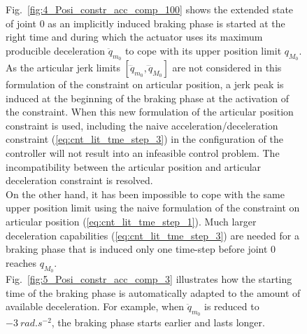 \begin{figure}[!htbp]
Fig.~\ref{fig:4_Posi_constr_acc_comp_100} shows the extended state of joint $0$ as an implicitly induced braking phase is started at the right time and during which the actuator uses its maximum producible deceleration $\ddot{q}_{m_{0}}$ to cope with its upper position limit $q_{M_{0}}$. As the articular jerk limits $[\dddot{q}_{m_{0}}, \dddot{q}_{M_{0}}]$ are not considered in this formulation of the constraint on articular position, a jerk peak is induced at the beginning of the braking phase at the activation of the constraint. When this new formulation of the articular position constraint is used, including the naive acceleration/deceleration constraint (\ref{eq:cnt_lit_tme_step_3}) in the configuration of the controller will not result into an infeasible control problem. The incompatibility between the articular position and articular deceleration constraint is resolved. \\
On the other hand, it has been impossible to cope with the same upper position limit using the naive formulation of the constraint on articular position (\ref{eq:cnt_lit_tme_step_1}). Much larger deceleration capabilities (\ref{eq:cnt_lit_tme_step_3}) are needed for a braking phase that is induced only one time-step before joint $0$ reaches $q_{M_{0}}$. \\
Fig.~\ref{fig:5_Posi_constr_acc_comp_3} illustrates how the starting time of the braking phase is automatically adapted to the amount of available deceleration. For example, when  $\ddot{q}_{m_{0}}$ is reduced to $-3~rad.s^{-2}$, the braking phase starts earlier and lasts longer.

\end{figure}
